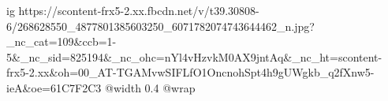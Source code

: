  
 
 
 
 

\ifcmt
  ig https://scontent-frx5-2.xx.fbcdn.net/v/t39.30808-6/268628550_4877801385603250_6071782074743644462_n.jpg?_nc_cat=109&ccb=1-5&_nc_sid=825194&_nc_ohc=nYl4vHzvkM0AX9jntAq&_nc_ht=scontent-frx5-2.xx&oh=00_AT-TGAMvwSIFLfO1OncnohSpt4h9gUWgkb_q2fXnw5-ieA&oe=61C7F2C3
  @width 0.4
  @wrap 
\fi
